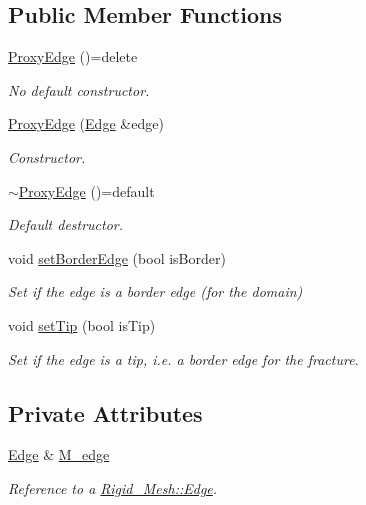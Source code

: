\subsection*{Public Member Functions}
\begin{DoxyCompactItemize}
\item 
\hyperlink{classFVCode3D_1_1ProxyEdge_a217a71b435bee1599be7277a60c4ccfa}{Proxy\+Edge} ()=delete
\begin{DoxyCompactList}\small\item\em No default constructor. \end{DoxyCompactList}\item 
\hyperlink{classFVCode3D_1_1ProxyEdge_ac176495583628bccf02fce0ac26a504d}{Proxy\+Edge} (\hyperlink{classFVCode3D_1_1ProxyEdge_ac30f33bd4416fe360398021fe1425e80}{Edge} \&edge)
\begin{DoxyCompactList}\small\item\em Constructor. \end{DoxyCompactList}\item 
\hyperlink{classFVCode3D_1_1ProxyEdge_a2f14e6817570123336b38859b074f000}{$\sim$\+Proxy\+Edge} ()=default
\begin{DoxyCompactList}\small\item\em Default destructor. \end{DoxyCompactList}\item 
void \hyperlink{classFVCode3D_1_1ProxyEdge_a3a9c2a3242118e9aeddb179ba69e6c7d}{set\+Border\+Edge} (bool is\+Border)
\begin{DoxyCompactList}\small\item\em Set if the edge is a border edge (for the domain) \end{DoxyCompactList}\item 
void \hyperlink{classFVCode3D_1_1ProxyEdge_a54da497385654537b5e809d18df274cc}{set\+Tip} (bool is\+Tip)
\begin{DoxyCompactList}\small\item\em Set if the edge is a tip, i.\+e. a border edge for the fracture. \end{DoxyCompactList}\end{DoxyCompactItemize}
\subsection*{Private Attributes}
\begin{DoxyCompactItemize}
\item 
\hyperlink{classFVCode3D_1_1ProxyEdge_ac30f33bd4416fe360398021fe1425e80}{Edge} \& \hyperlink{classFVCode3D_1_1ProxyEdge_aaf251030dfaa502e9280eb2dbb65094d}{M\+\_\+edge}
\begin{DoxyCompactList}\small\item\em Reference to a \hyperlink{classFVCode3D_1_1Rigid__Mesh_1_1Edge}{Rigid\+\_\+\+Mesh\+::\+Edge}. \end{DoxyCompactList}\end{DoxyCompactItemize}


